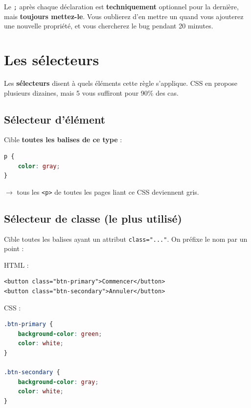 \documentclass[11pt,a4paper]{article}
\begin{document}
\begin{retenirbox}
Le \texttt{;} après chaque déclaration est \textbf{techniquement} optionnel
pour la dernière, mais \textbf{toujours mettez-le}. Vous oublierez d'en
mettre un quand vous ajouterez une nouvelle propriété, et vous chercherez
le bug pendant 20 minutes.
\end{retenirbox}

\newpage

\section{Les sélecteurs}

Les \textbf{sélecteurs} disent \og{}à quels éléments cette règle
s'applique\fg{}. CSS en propose plusieurs dizaines, mais 5 vous
suffiront pour 90\% des cas.

\subsection{Sélecteur d'élément}

Cible \textbf{toutes les balises de ce type} :

\begin{lstlisting}[language=CSS]
p {
    color: gray;
}
\end{lstlisting}

$\to$ tous les \texttt{<p>} de toutes les pages liant ce CSS deviennent
gris.

\subsection{Sélecteur de classe (le plus utilisé)}

Cible toutes les balises ayant un attribut \texttt{class="..."}. On
préfixe le nom par un point :

HTML :
\begin{lstlisting}[language=HTML5]
<button class="btn-primary">Commencer</button>
<button class="btn-secondary">Annuler</button>
\end{lstlisting}

CSS :
\begin{lstlisting}[language=CSS]
.btn-primary {
    background-color: green;
    color: white;
}

.btn-secondary {
    background-color: gray;
    color: white;
}
\end{lstlisting}
\end{document}
